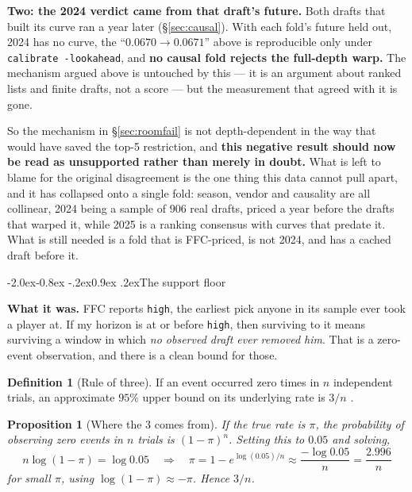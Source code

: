 \documentclass[10pt,a4paper]{article}
\makeatletter
\theoremstyle{plain}
\newtheorem{proposition}[theorem]{Proposition}
\theoremstyle{definition}
\newtheorem{definition}[theorem]{Definition}
\theoremstyle{remark}
\newcommand{\code}[1]{\texttt{\small #1}}
\renewcommand\subsection{\@startsection{subsection}{2}{\z@}%
  {-2.0ex\@plus -0.8ex \@minus -.2ex}{0.9ex \@plus .2ex}{\normalfont\large\bfseries}}
\makeatother
\begin{document}
\textbf{Two: the 2024 verdict came from that draft's future.} Both drafts that built its
curve ran a year later (\S\ref{sec:causal}). With each fold's future held out, 2024 has no
curve, the ``$0.0670 \to 0.0671$'' above is reproducible only under
\code{calibrate -lookahead}, and \textbf{no causal fold rejects the full-depth warp.} The
mechanism argued above is untouched by this --- it is an argument about ranked lists and
finite drafts, not a score --- but the measurement that agreed with it is gone.

So the mechanism in \S\ref{sec:roomfail} is not depth-dependent in the way that would have
saved the top-5 restriction, and \textbf{this negative result should now be read as
unsupported rather than merely in doubt.} What is left to blame for the original
disagreement is the one thing this data cannot pull apart, and it has collapsed onto a
single fold: season, vendor and causality are all collinear, 2024 being a sample of $906$
real drafts, priced a year before the drafts that warped it, while 2025 is a ranking
consensus with curves that predate it. What is still needed is a fold that is FFC-priced,
is not 2024, and has a cached draft before it.

\subsection{The support floor}
\label{sec:floorfail}

\textbf{What it was.} FFC reports \code{high}, the earliest pick anyone in its sample ever
took a player at. If my horizon is at or before \code{high}, then surviving to it means
surviving a window in which \emph{no observed draft ever removed him}. That is a zero-
event observation, and there is a clean bound for those.

\begin{definition}[Rule of three]
If an event occurred zero times in $n$ independent trials, an approximate $95\%$ upper
bound on its underlying rate is $3/n$ \cite{hanley1983}.
\end{definition}

\begin{proposition}[Where the 3 comes from]
If the true rate is $\pi$, the probability of observing zero events in $n$ trials is
$(1-\pi)^n$. Setting this to $0.05$ and solving,
\[
n\log(1-\pi) = \log 0.05 \quad\Longrightarrow\quad
\pi = 1 - e^{\log(0.05)/n} \approx \frac{-\log 0.05}{n} = \frac{2.996}{n}
\]
for small $\pi$, using $\log(1-\pi) \approx -\pi$. Hence $3/n$.
\end{proposition}
\end{document}
